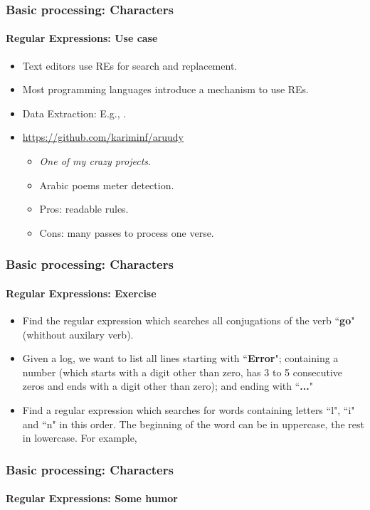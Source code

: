 \documentclass[xcolor=table]{beamer}
\begin{document}
\begin{frame}
\frametitle{Basic processing: Characters}
\framesubtitle{Regular Expressions: Use case}

\begin{itemize}
	\item Text editors use REs for search and replacement.
	\item Most programming languages introduce a mechanism to use REs.
	\item Data Extraction: E.g., .
	\item \url{https://github.com/kariminf/aruudy}
	\begin{itemize}
		\item \textit{One of my crazy projects}.
		\item Arabic poems meter detection.
		\item Pros: readable rules.
		\item Cons: many passes to process one verse.
	\end{itemize}
\end{itemize}

\end{frame}


\begin{frame}
	\frametitle{Basic processing: Characters}
	\framesubtitle{Regular Expressions: Exercise}
	
	\begin{itemize}
		\item Find the regular expression which searches all conjugations of the verb ``\textbf{go}" (whithout auxilary verb). 
		\item Given a log, we want to list all lines starting with ``\textbf{Error}"; containing a number (which starts with a digit other than zero, has 3 to 5 consecutive zeros and ends with a digit other than zero); and ending with ``\textbf{...}"
		\item Find a regular expression which searches for words containing letters ``l", ``i" and ``n" in this order. The beginning of the word can be in uppercase, the rest in lowercase. For example, 
	\end{itemize}
	
\end{frame}

\begin{frame}
\frametitle{Basic processing: Characters}
\framesubtitle{Regular Expressions: Some humor}

\begin{center}
\end{center}

\end{frame}
\end{document}
